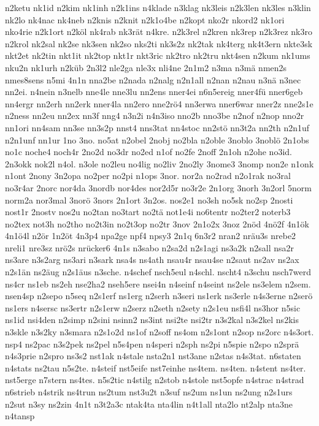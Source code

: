 {n2ketu
nk1id
n2kim
nk1inh
n2k1ins
n4klade
n3klag
nk3leis
n2k3len
nk3les
n3klin
nk2lo
nk4nac
nk4neb
n2knis
n2knit
n2k1o4be
n2kopt
nko2r
nkord2
nk1ori
nko4rie
n2k1ort
n2köl
nk4rab
nk3rät
n4kre.
n2k3rel
n2kren
nk3rep
n2k3rez
nk3ro
n2krol
nk2sal
nk2se
nk3sen
nk2so
nks2ti
nk3s2z
nk2tak
nk4terg
nk4t3ern
nkte3sk
nkt2et
nk2tin
nkt1it
nk2top
nkt1r
nkt3ric
nk2tro
nk2tru
nkt4sen
n2kum
nk1ums
nku2n
nk1urh
n2küb
2n3l2
nle2ga
nle3x
nli4ne
2n1m2
n3ma
n3mä
nmen2s
nmes8sens
n5mi
4n1n
nna2be
n2nada
n2nalg
n2n1all
n2nan
n2nau
n3nä
n3nec
nn2ei.
n4nein
n3nelb
nne4le
nne3lu
nn2ens
nner4ei
n6n5ereig
nner4fü
nner6geb
nn4ergr
nn2erh
nn2erk
nner4la
nn2ero
nne2rö4
nn3erwa
nner6war
nner2z
nne2s1e
n2ness
nn2eu
nn2ex
nn3f
nng4
n3n2i
n4n3iso
nno2b
nno3be
n2nof
n2nop
nno2r
nn1ori
nn4sam
nn3se
nn3s2p
nnst4
nns3tat
nn4stoc
nn2stö
nn3t2a
nn2th
n2n1uf
n2n1unf
nn1ur
1no
3no.
no5at
n2obel
2nobj
no2bla
n2oble
3noblo
3noblö
2n1obs
no1c
noche4
noch4r
2no2d
no3dr
no2ed
n1of
no2fe
2noff
2n1oh
n2ohe
no3id.
2n3okk
nok2l
n4ol.
n3ole
no2leu
no4lig
no2liv
2no2ly
3nome3
3nomp
non2e
n1onk
n1ont
2nony
3n2opa
no2per
no2pi
n1ops
3nor.
nor2a
no2rad
n2o1rak
no3ral
no3r4ar
2norc
nor4da
3nordb
nor4des
nor2d5r
no3r2e
2n1org
3norh
3n2orl
5norm
norm2a
nor3mal
3norö
3nors
2n1ort
3n2os.
nos2e1
no3sh
no5sk
no2sp
2nosti
nost1r
2nostv
nos2u
no2tan
no3tart
no2tä
not1e4i
no6tentr
no2ter2
noterb3
no2tex
not3h
no2tho
no2t3in
no2t3op
no2tr
3nov
2n1o2x
3noz
2nöd
4nö2f
4n1ök
4n1ö4l
n2ör
1n2öt
4n3p4
npa2ge
npf4
npsy3
2n1q
6n3r2
nran2
nräu3s
nrebe2
nreli1
nre3sz
nrö2s
nrücker6
4n1s
n3sabo
n2sa2d
n2s1agi
ns3a2k
n2sall
nsa2r
ns3are
n3s2arg
ns3ari
n3sark
nsa4s
ns4ath
nsau4r
nsau4se
n2saut
ns2av
ns2ax
n2s1än
ns2äug
n2s1äus
n3sche.
n4schef
nsch5eul
n4schl.
nscht4
n3schu
nsch7werd
ns4cr
ns1eb
ns2eh
nse2ha2
nseh5ere
nsei4n
n4seinf
n4seint
ns2ele
ns3elem
n2sem.
nsen4sp
n2sepo
n5seq
n2s1erf
ns1erg
n2serh
n3seri
ns1erk
ns3erle
n4s3erne
n2serö
ns1ers
n4sersc
ns3ertr
n2s1erw
n2serz
n2seth
n2sety
n2s1eu
nsfi4l
ns3hor
n5sic
ns1id
nsi4den
n2simp
n2sini
nsinn2
ns3int
nsi2te
nsi2tr
n3s2kal
n3s2kel
ns2kis
n3skle
n3s2ky
n3smara
n2s1o2d
ns1of
n2soff
ns4om
n2s1ont
n2sop
ns2orc
n4s3ort.
nsp4
ns2pac
n3s2pek
ns2pel
n5s4pen
n4speri
n2sph
ns2pi
n5spie
n2spo
n2sprä
n4s3prie
n2spro
ns3s2
nst1ak
n4stale
nsta2n1
nst3ane
n2stas
n4s3tat.
n6staten
n4stats
ns2tau
n5s2te.
n4steif
nst5eife
nst7einhe
ns4tem.
ns4ten.
n4stent
ns4ter.
nst5erge
n7stern
ns4tes.
n5s2tic
n4stilg
n2stob
n4stole
nst5opfe
n4strac
n4strad
n6strieb
n4strik
ns4trun
ns2tum
nst3u2t
n3suf
ns2um
ns1un
ns2ung
n2s1urs
n2sut
n3sy
ns2zin
4n1t
n3t2a3c
ntak4ta
nta4lin
n4t1all
nta2lo
nt2alp
nta3ne
n4tansp
}

